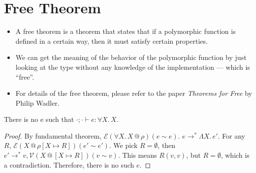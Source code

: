 \documentclass{lecturenotes}
\makeatletter
\newcommand{\fatype}[2]{\ensuremath{\forall #1.\,#2}}
\newcommand{\Abs}[2]{\Lambda #1.\,#2}
\newcommand{\at}{\ensuremath{\mathrel{@}}}
\newcommand{\binval}[4]{\ensuremath{\mathcal{V}(#1 \at #2)(#3 \sim #4)}}
\newcommand{\binexpr}[4]{\ensuremath{\mathcal{E}(#1 \at #2)(#3 \sim #4)}}
\makeatother
\begin{document}
\section{Free Theorem}\label{sec:free-theorem}
\begin{itemize}
    \item A free theorem is a theorem that states that if a polymorphic function is defined in a certain way, then it must satisfy certain properties.
    \item We can get the meaning of the behavior of the polymorphic function by just looking at the type
          without any knowledge of the implementation --- which is ``free''.
    \item For details of the free theorem, please refer to the paper \emph{Theorems for Free} by Philip Wadler.
\end{itemize}
\begin{thm}
    There is no e such that $\cdot; \cdot \vdash e : \fatype{X}{X}$.
\end{thm}
\begin{proof}
    By fundamental theorem, $\binexpr{\fatype{X}{X}}{\rho}{e}{e}$.
    $e \to^\ast \Abs{X}{e'}$. For any $R$, $\binexpr{X}{\rho[X \mapsto R]}{e'}{e'}$.
    We pick $R=\emptyset$, then $e' \to^\ast v, \binval{X}{[X \mapsto R]}{v}{v}$.
    This means $R(v,v)$, but $R=\emptyset$, which is a contradiction.
    Therefore, there is no such $e$.
\end{proof}
\end{document}
